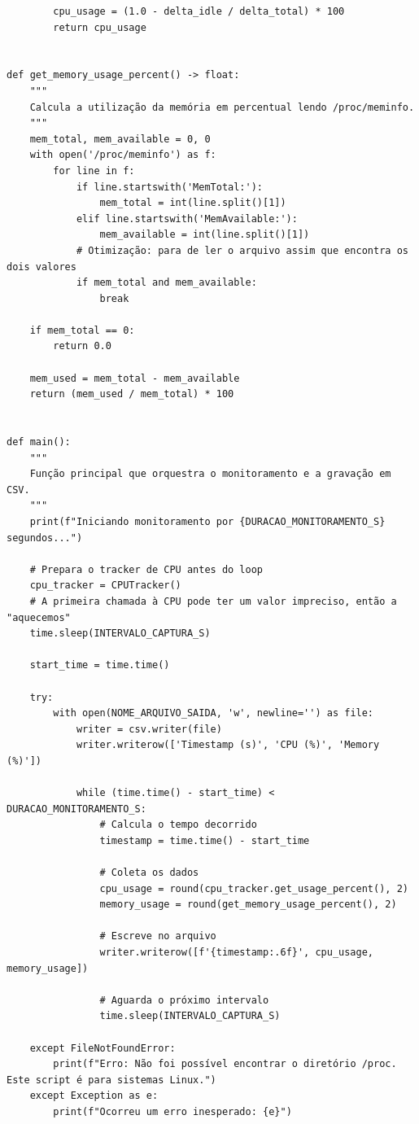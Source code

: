 \begin{anexosenv}
\begin{verbatim}
        cpu_usage = (1.0 - delta_idle / delta_total) * 100
        return cpu_usage


def get_memory_usage_percent() -> float:
    """
    Calcula a utilização da memória em percentual lendo /proc/meminfo.
    """
    mem_total, mem_available = 0, 0
    with open('/proc/meminfo') as f:
        for line in f:
            if line.startswith('MemTotal:'):
                mem_total = int(line.split()[1])
            elif line.startswith('MemAvailable:'):
                mem_available = int(line.split()[1])
            # Otimização: para de ler o arquivo assim que encontra os dois valores
            if mem_total and mem_available:
                break
    
    if mem_total == 0:
        return 0.0
        
    mem_used = mem_total - mem_available
    return (mem_used / mem_total) * 100


def main():
    """
    Função principal que orquestra o monitoramento e a gravação em CSV.
    """
    print(f"Iniciando monitoramento por {DURACAO_MONITORAMENTO_S} segundos...")
    
    # Prepara o tracker de CPU antes do loop
    cpu_tracker = CPUTracker()
    # A primeira chamada à CPU pode ter um valor impreciso, então a "aquecemos"
    time.sleep(INTERVALO_CAPTURA_S) 

    start_time = time.time()
    
    try:
        with open(NOME_ARQUIVO_SAIDA, 'w', newline='') as file:
            writer = csv.writer(file)
            writer.writerow(['Timestamp (s)', 'CPU (%)', 'Memory (%)'])

            while (time.time() - start_time) < DURACAO_MONITORAMENTO_S:
                # Calcula o tempo decorrido
                timestamp = time.time() - start_time
                
                # Coleta os dados
                cpu_usage = round(cpu_tracker.get_usage_percent(), 2)
                memory_usage = round(get_memory_usage_percent(), 2)

                # Escreve no arquivo
                writer.writerow([f'{timestamp:.6f}', cpu_usage, memory_usage])
                
                # Aguarda o próximo intervalo
                time.sleep(INTERVALO_CAPTURA_S)

    except FileNotFoundError:
        print(f"Erro: Não foi possível encontrar o diretório /proc. Este script é para sistemas Linux.")
    except Exception as e:
        print(f"Ocorreu um erro inesperado: {e}")
        

\end{verbatim}
\end{anexosenv}
